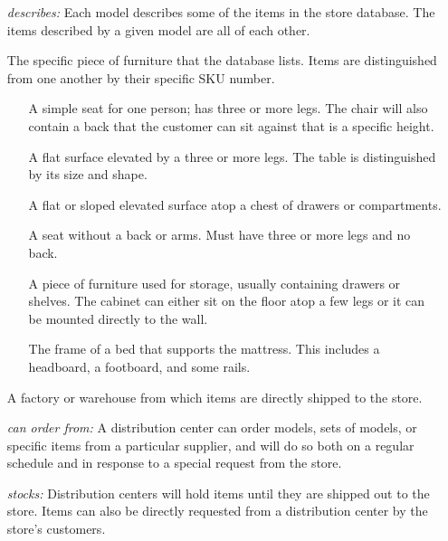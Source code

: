 \documentclass[american,extrafontsizes,12pt,portrait,letterpaper,oneside,onecolumn,final]{memoir}
\begin{document}
\begin{enumerate}[leftmargin=*,widest={\strong{Distribution Center:}}]
\item[\emph{\hypertarget{Model-Item-rel}{describes}:}]
Each model describes some of the items in the store database.
The items described by a given model are all  of each other.

\item[\strong{\hypertarget{Item}{Item}:}]
The specific piece of furniture that the database lists.
Items are distinguished from one another by their specific SKU number.

\begin{enumerate}[leftmargin=*,widest={\strong{Bedframe:}}]

\item[\strong{\hypertarget{Chair}{Chair}:}]
A simple seat for one person; has three or more legs.
The chair will also contain a back that the customer can sit against that is a specific height.

\item[\strong{\hypertarget{Table}{Table}:}]
A flat surface elevated by a three or more legs.
The table is distinguished by its size and shape.

\item[\strong{\hypertarget{Desk}{Desk}:}]
A flat or sloped elevated surface atop a chest of drawers or compartments.

\item[\strong{\hypertarget{Stool}{Stool}:}]
A seat without a back or arms.
Must have three or more legs and no back.

\item[\strong{\hypertarget{Cabinet}{Cabinet}:}]
A piece of furniture used for storage, usually containing drawers or shelves.
The cabinet can either sit on the floor atop a few legs or it can be mounted directly to the wall.

\item[\strong{\hypertarget{Bedframe}{Bedframe}:}]
The frame of a bed that supports the mattress.
This includes a headboard, a footboard, and some rails.
\end{enumerate}

\item[\strong{\hypertarget{DistributionCenter}{Distribution Center}:}]
A factory or warehouse from which items are directly shipped to the store.

\item[\emph{\hypertarget{DistributionCenter-Supplier-rel}{can order from}:}]
A distribution center can order models, sets of models, or specific items from a particular supplier, and will do so both on a regular schedule and in response to a special request from the store.

\item[\emph{\hypertarget{DistributionCenter-Item-rel}{stocks}:}]
Distribution centers will hold items until they are shipped out to the store.
Items can also be directly requested from a distribution center by the store's customers.

\end{enumerate}
\end{document}
